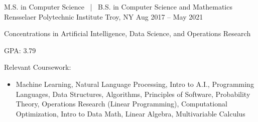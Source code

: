 


\begin{cventries}

  \cventry
  {M.S. in Computer Science \, | \, B.S. in Computer Science and Mathematics}
  {Rensselaer Polytechnic Institute}
  {Troy, NY}
  {Aug 2017 -- May 2021}
  {
    \begin{cvitems}
      \item Concentrations in Artificial Intelligence, Data Science, and Operations Research
      \item GPA: 3.79
      \item Relevant Coursework:
      \begin{itemize}
        \item Machine Learning, Natural Language Processing, Intro to A.I., Programming Languages, Data Structures, Algorithms, \newline
              Principles of Software, Probability Theory, Operations Research (Linear Programming), Computational Optimization, \newline
              Intro to Data Math, Linear Algebra, Multivariable Calculus
      \end{itemize}
    \end{cvitems}
  }


\end{cventries}